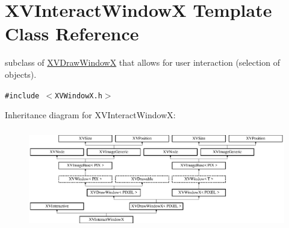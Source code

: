 \hypertarget{class_XVInteractWindowX}{
\section{XVInteract\-Window\-X  Template Class Reference}
\label{XVInteractWindowX}
}
subclass of \hyperlink{class_XVDrawWindowX}{XVDraw\-Window\-X} that allows for user interaction (selection of objects). 


{\tt \#include $<$XVWindow\-X.h$>$}

Inheritance diagram for XVInteract\-Window\-X:\begin{figure}[H]
\begin{center}
\leavevmode
\includegraphics[height=4.35556cm]{class_XVInteractWindowX}
\end{center}
\end{figure}
